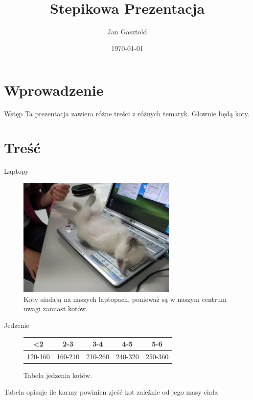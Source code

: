 \documentclass{beamer}
\title{Stepikowa Prezentacja}
\author{Jan Gasztold}
\date{\today}
\begin{document}
\begin{frame}
  \titlepage
\end{frame}

\section{Wprowadzenie}

\begin{frame}{Wstęp}
  Ta prezentacja zawiera różne treści z różnych tematyk.
  Głownie będą koty.
\end{frame}

\section{Treść}

\begin{frame}{Laptopy}
  \begin{figure}
    \centering
    \includegraphics[width=0.7\textwidth]{image1.png}
    \caption{Koty siadają na naszych laptopach, ponieważ są w naszym centrum uwagi zamiast kotów.}
    \label{fig:rys1}
  \end{figure}
\end{frame}

\begin{frame}{Jedzenie}
  \begin{figure}[h]
    \centering
    \begin{tabular}{|c|c|c|c|c|}
        \hline
        <2 & 2-3 & 3-4 & 4-5 & 5-6 \\
        \hline
        120-160 & 160-210 & 210-260 & 240-320 & 250-360 \\
        \hline
    \end{tabular}
    \caption{Tabela jedzenia kotów.}
    \label{tab:tabela1}
\end{figure}
Tabela opisuje ile karmy powinien zjeść kot zależnie od jego masy ciała \cite{autor1}
\end{frame}
\end{document}
